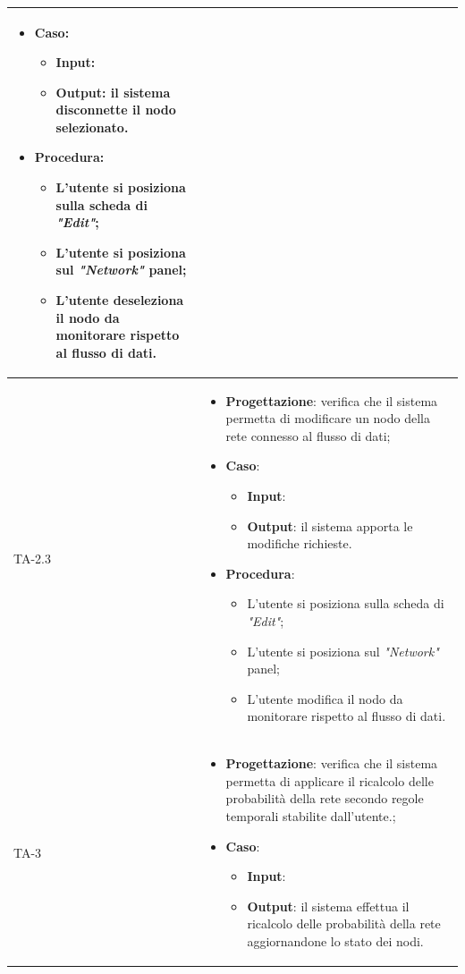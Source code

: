 \begin{longtable}{|C{2.5cm}|C{13cm}|}
\begin{itemize}
	\item \textbf{Caso}: 
	\begin{itemize}
		\item \textbf{Input}:
		\item \textbf{Output}: il sistema disconnette il nodo selezionato.
	\end{itemize}
	\item \textbf{Procedura}:
	\begin{itemize}
		\item L'utente si posiziona sulla scheda di \emph{"Edit"};
		\item L'utente si posiziona sul \emph{"Network"} panel;
		\item L'utente deseleziona il nodo da monitorare rispetto al flusso di dati.
	\end{itemize} 
\end{itemize} \\
\hline
{TA-2.3} &
\begin{itemize}
	\item \textbf{Progettazione}: verifica che il sistema permetta di modificare un nodo della rete connesso al flusso di dati;
	\item \textbf{Caso}: 
	\begin{itemize}
		\item \textbf{Input}: 
		\item \textbf{Output}: il sistema apporta le modifiche richieste.
	\end{itemize}
	\item \textbf{Procedura}:
	\begin{itemize}
		\item L'utente si posiziona sulla scheda di \emph{"Edit"};
		\item L'utente si posiziona sul \emph{"Network"} panel;
		\item L'utente modifica il nodo da monitorare rispetto al flusso di dati.
	\end{itemize} 
\end{itemize}\\
\hline
{TA-3} &
\begin{itemize}
	\item \textbf{Progettazione}: verifica che il sistema permetta di applicare il
	ricalcolo delle probabilità della rete
	secondo regole temporali stabilite dall'utente.;
	\item \textbf{Caso}: 
	\begin{itemize}
		\item \textbf{Input}: 
		\item \textbf{Output}: il sistema effettua il ricalcolo delle probabilità della rete aggiornandone lo stato dei nodi.

\end{itemize}
\end{itemize}
\end{longtable}
